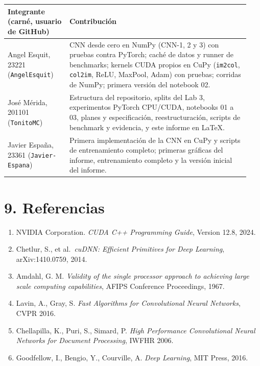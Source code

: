 \documentclass[
  11pt,
]{article}
\providecommand{\tightlist}{%
  \setlength{\itemsep}{0pt}\setlength{\parskip}{0pt}}
\begin{document}
\begin{longtable}[]{@{}p{0.24\linewidth}p{0.70\linewidth}@{}}
\toprule\noalign{}
Integrante (carné, usuario de GitHub) & Contribución \\
\midrule\noalign{}
\endhead
\bottomrule\noalign{}
\endlastfoot
Angel Esquit, 23221 (\texttt{AngelEsquit}) & CNN desde cero en NumPy (CNN-1, 2 y 3) con pruebas contra PyTorch; caché de datos y runner de benchmarks; kernels CUDA propios en CuPy (\texttt{im2col}, \texttt{col2im}, ReLU, MaxPool, Adam) con pruebas; corridas de NumPy; primera versión del notebook 02. \\
José Mérida, 201101 (\texttt{TonitoMC}) & Estructura del repositorio, splits del Lab 3, experimentos PyTorch CPU/CUDA, notebooks 01 a 03, planes y especificación, reestructuración, scripts de benchmark y evidencia, y este informe en LaTeX. \\
Javier España, 23361 (\texttt{Javier-Espana}) & Primera implementación de la CNN en CuPy y scripts de entrenamiento completo; primeras gráficas del informe, entrenamiento completo y la versión inicial del informe. \\
\end{longtable}

\clearpage
\section{9. Referencias}\label{referencias-bibliogruxe1ficas}

\begin{enumerate}
\def\labelenumi{\arabic{enumi}.}
\tightlist
\item
  NVIDIA Corporation. \emph{CUDA C++ Programming Guide},
  Version 12.8, 2024.
\item
  Chetlur, S., et al.~\emph{cuDNN: Efficient Primitives for
  Deep Learning}, arXiv:1410.0759, 2014.
\item
  Amdahl, G. M. \emph{Validity of the single processor
  approach to achieving large scale computing capabilities},
  AFIPS Conference Proceedings, 1967.
\item
  Lavin, A., Gray, S. \emph{Fast Algorithms for
  Convolutional Neural Networks}, CVPR 2016.
\item
  Chellapilla, K., Puri, S., Simard, P. \emph{High
  Performance Convolutional Neural Networks for Document
  Processing}, IWFHR 2006.
\item
  Goodfellow, I., Bengio, Y., Courville, A. \emph{Deep
  Learning}, MIT Press, 2016.
\end{enumerate}
\end{document}
